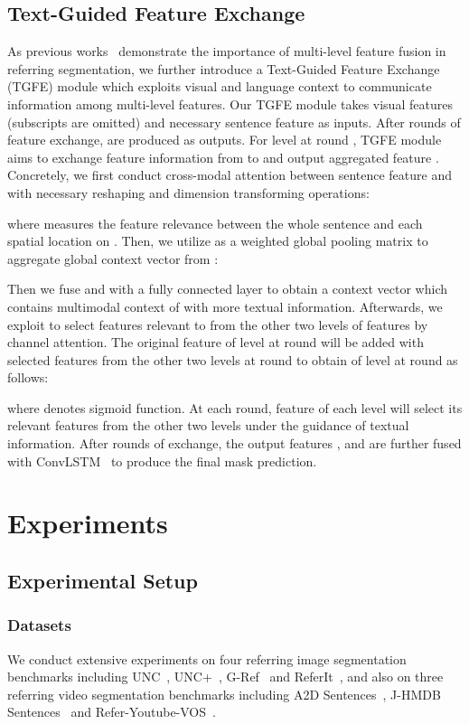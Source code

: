 \documentclass[10pt,journal,cspaper,compsoc]{IEEEtran}
\begin{document}
\subsection{Text-Guided Feature Exchange}
As previous works~\cite{li2018referring}\cite{ye2019cross}\cite{chen2019see} demonstrate the importance of multi-level feature fusion in referring segmentation, 
we further introduce a Text-Guided Feature Exchange (TGFE) module which exploits visual and language context to communicate information among multi-level features. 
Our TGFE module takes visual features  (subscripts are omitted) and necessary sentence feature  as inputs. 
After  rounds of feature exchange,  are produced as outputs. 
For level  at round , TGFE module aims to exchange feature information from  to  and output aggregated feature . 
Concretely, we first conduct cross-modal attention between sentence feature  and  with necessary reshaping and dimension transforming operations: 

where  measures the feature relevance between the whole sentence and each spatial location on . 
Then, we utilize  as a weighted global pooling matrix to aggregate global context vector  from : 

Then we fuse  and  with a fully connected layer to obtain a context vector  which contains multimodal context of  with more textual information. 
Afterwards, we exploit  to select features relevant to  from the other two levels of features  by channel attention. 
The original feature  of level  at round  will be added with selected features from the other two levels at round  to obtain  of level  at round  as follows: 

where  denotes sigmoid function. 
At each round, feature of each level  will select its relevant features from the other two levels under the guidance of textual information. 
After  rounds of exchange, the output features ,  and  are further fused with ConvLSTM~\cite{xingjian2015convolutional} to produce the final mask prediction. 

\section{Experiments}
\subsection{Experimental Setup}
\label{sec:setup}
\subsubsection{Datasets}
We conduct extensive experiments on four referring image segmentation benchmarks including UNC~\cite{yu2016modeling}, UNC+~\cite{yu2016modeling}, G-Ref~\cite{mao2016generation} and ReferIt~\cite{kazemzadeh2014referitgame}, and also on three referring video segmentation benchmarks including A2D Sentences~\cite{gavrilyuk2018actor}, J-HMDB Sentences~\cite{gavrilyuk2018actor} and Refer-Youtube-VOS~\cite{seo2020urvos}.
\end{document}
